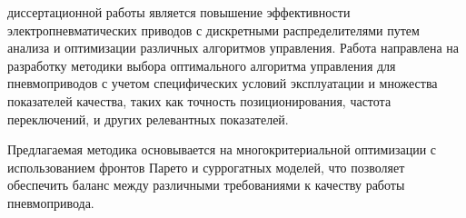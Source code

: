 
{\actuality} %

\ifsynopsis

\else

\fi


{\aim}  диссертационной работы является повышение эффективности электропневматических приводов с
дискретными распределителями путем анализа и оптимизации различных алгоритмов управления.
Работа направлена на разработку методики выбора оптимального алгоритма управления для пневмоприводов
с учетом специфических условий эксплуатации и множества показателей качества, таких как точность позиционирования,
частота переключений, и других релевантных показателей.

Предлагаемая методика основывается на многокритериальной оптимизации с использованием фронтов Парето
и суррогатных моделей, что позволяет обеспечить баланс между различными требованиями к качеству работы пневмопривода.

